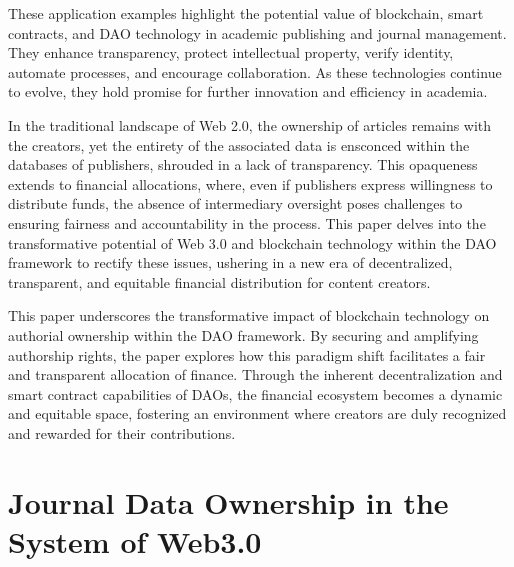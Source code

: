 \documentclass[lettersize,journal]{IEEEtran}
\begin{document}
These application examples highlight the potential value of blockchain, smart contracts, and DAO technology in academic publishing and journal management. They enhance transparency, protect intellectual property, verify identity, automate processes, and encourage collaboration. As these technologies continue to evolve, they hold promise for further innovation and efficiency in academia.

In the traditional landscape of Web 2.0, the ownership of articles remains with the creators, yet the entirety of the associated data is ensconced within the databases of publishers, shrouded in a lack of transparency. This opaqueness extends to financial allocations, where, even if publishers express willingness to distribute funds, the absence of intermediary oversight poses challenges to ensuring fairness and accountability in the process. This paper delves into the transformative potential of Web 3.0 and blockchain technology within the DAO framework to rectify these issues, ushering in a new era of decentralized, transparent, and equitable financial distribution for content creators.

This paper underscores the transformative impact of blockchain technology on authorial ownership within the DAO framework. By securing and amplifying authorship rights, the paper explores how this paradigm shift facilitates a fair and transparent allocation of finance. Through the inherent decentralization and smart contract capabilities of DAOs, the financial ecosystem becomes a dynamic and equitable space, fostering an environment where creators are duly recognized and rewarded for their contributions.

\section{Journal Data Ownership in the System of Web3.0}
\end{document}
